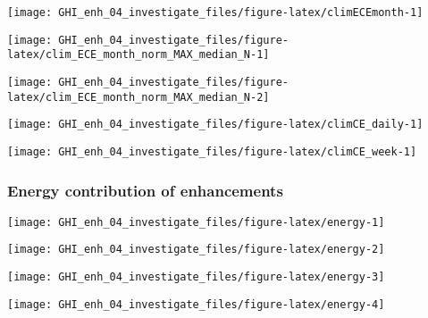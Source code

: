 \documentclass[
  10pt,
  a4paper,oneside]{article}
\begin{document}
\begin{center}\texttt{[image: GHI\_enh\_04\_investigate\_files/figure-latex/climECEmonth-1]} \end{center}

\begin{center}\texttt{[image: GHI\_enh\_04\_investigate\_files/figure-latex/clim\_ECE\_month\_norm\_MAX\_median\_N-1]} \end{center}

\begin{center}\texttt{[image: GHI\_enh\_04\_investigate\_files/figure-latex/clim\_ECE\_month\_norm\_MAX\_median\_N-2]} \end{center}

\begin{center}\texttt{[image: GHI\_enh\_04\_investigate\_files/figure-latex/climCE\_daily-1]} \end{center}

\begin{center}\texttt{[image: GHI\_enh\_04\_investigate\_files/figure-latex/climCE\_week-1]} \end{center}

\newpage
\FloatBarrier

\hypertarget{energy-contribution-of-enhancements}{%
\subsubsection{Energy contribution of enhancements}\label{energy-contribution-of-enhancements}}

\begin{center}\texttt{[image: GHI\_enh\_04\_investigate\_files/figure-latex/energy-1]} \end{center}

\begin{center}\texttt{[image: GHI\_enh\_04\_investigate\_files/figure-latex/energy-2]} \end{center}

\begin{center}\texttt{[image: GHI\_enh\_04\_investigate\_files/figure-latex/energy-3]} \end{center}

\begin{center}\texttt{[image: GHI\_enh\_04\_investigate\_files/figure-latex/energy-4]} \end{center}
\end{document}
